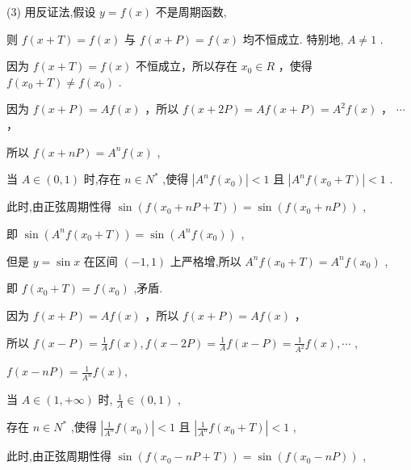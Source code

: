 \documentclass[10pt]{article}
\newcommand*\circled[1]{\tikz[baseline=(char.base)]{\node[shape=circle,draw,inner sep=1.5pt] (char) {\small #1};}}
\begin{document}
(3) 用反证法,假设 \(y = f\left( x\right)\) 不是周期函数,

则 \(f\left( {x + T}\right)  = f\left( x\right)\) 与 \(f\left( {x + P}\right)  = f\left( x\right)\) 均不恒成立. 特别地, \(A \neq  1\) .

因为 \(f\left( {x + T}\right)  = f\left( x\right)\) 不恒成立，所以存在 \({x}_{0} \in  R\) ，使得 \(f\left( {{x}_{0} + T}\right)  \neq  f\left( {x}_{0}\right)\) .

 \circled{1} 因为 \(f\left( {x + P}\right)  = {Af}\left( x\right)\) ，所以 \(f\left( {x + {2P}}\right)  = {Af}\left( {x + P}\right)  = {A}^{2}f\left( x\right)\) ， \(\cdots\) ，

所以 \(f\left( {x + {nP}}\right)  = {A}^{n}f\left( x\right)\) ,

当 \(A \in  \left( {0,1}\right)\) 时,存在 \(n \in  {N}^{ * }\) ,使得 \(\left| {{A}^{n}f\left( {x}_{0}\right) }\right|  < 1\) 且 \(\left| {{A}^{n}f\left( {{x}_{0} + T}\right) }\right|  < 1\) .

此时,由正弦周期性得 \(\sin \left( {f\left( {{x}_{0} + {nP} + T}\right) }\right)  = \sin \left( {f\left( {{x}_{0} + {nP}}\right) }\right)\) ,

即 \(\sin \left( {{A}^{n}f\left( {{x}_{0} + T}\right) }\right)  = \sin \left( {{A}^{n}f\left( {x}_{0}\right) }\right)\) ,

但是 \(y = \sin x\) 在区间 \(\left( {-1,1}\right)\) 上严格增,所以 \({A}^{n}f\left( {{x}_{0} + T}\right)  = {A}^{n}f\left( {x}_{0}\right)\) ,

即 \(f\left( {{x}_{0} + T}\right)  = f\left( {x}_{0}\right)\) ,矛盾.

 \circled{2} 因为 \(f\left( {x + P}\right)  = {Af}\left( x\right)\) ，所以 \(f\left( {x + P}\right)  = {Af}\left( x\right)\) ，

所以 \(f\left( {x - P}\right)  = \frac{1}{A}f\left( x\right) ,f\left( {x - {2P}}\right)  = \frac{1}{A}f\left( {x - P}\right)  = \frac{1}{{A}^{2}}f\left( x\right) ,\cdots\) ,

\(f\left( {x - {nP}}\right)  = \frac{1}{{A}^{n}}f\left( x\right) ,\)

当 \(A \in  \left( {1, + \infty }\right)\) 时, \(\frac{1}{A} \in  \left( {0,1}\right)\) ,

存在 \(n \in  {N}^{ * }\) ,使得 \(\left| {\frac{1}{{A}^{n}}f\left( {x}_{0}\right) }\right|  < 1\) 且 \(\left| {\frac{1}{{A}^{n}}f\left( {{x}_{0} + T}\right) }\right|  < 1\) ,

此时,由正弦周期性得 \(\sin \left( {f\left( {{x}_{0} - {nP} + T}\right) }\right)  = \sin \left( {f\left( {{x}_{0} - {nP}}\right) }\right)\) ,
\end{document}
